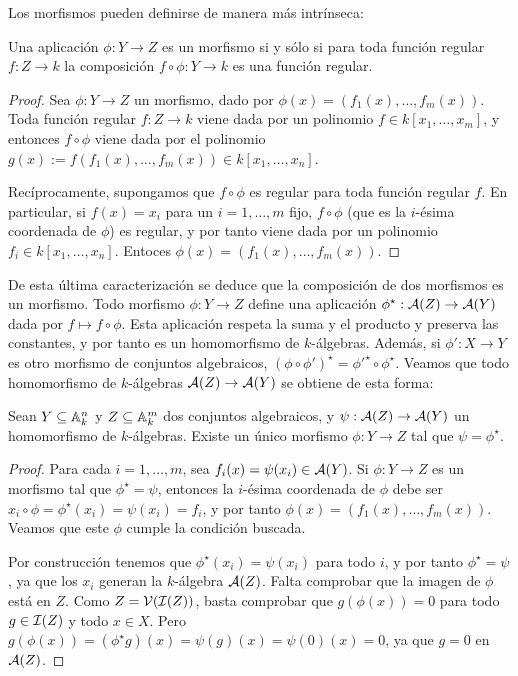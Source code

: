 \documentclass[ACGA.tex]{subfiles}
\begin{document}
Los morfismos pueden definirse de manera más intrínseca:

\begin{prop}
 Una aplicación $\phi:Y\to Z$ es un morfismo si y sólo si para toda función regular $f:Z\to k$ la composición $f\circ\phi:Y\to k$ es una función regular.
\end{prop}

 \begin{proof}
  Sea $\phi:Y\to Z$ un morfismo, dado por $\phi(x)=(f_1(x),\ldots,f_m(x))$. Toda función regular $f:Z\to k$ viene dada por un polinomio $f\in k[x_1,\ldots,x_m]$, y entonces $f\circ\phi$ viene dada por el polinomio $g(x):=f(f_1(x),\ldots,f_m(x))\in k[x_1,\ldots,x_n]$.

Recíprocamente, supongamos que $f\circ\phi$ es regular para toda función regular $f$. En particular, si $f(x)=x_i$ para un $i=1,\ldots,m$ fijo, $f\circ\phi$ (que es la $i$-ésima coordenada de $\phi$) es regular, y por tanto viene dada por un polinomio $f_i\in k[x_1,\ldots,x_n]$. Entoces $\phi(x)=(f_1(x),\ldots,f_m(x))$.
 \end{proof}

De esta última caracterización se deduce que la composición de dos morfismos es un morfismo. Todo morfismo $\phi:Y\to Z$ define una aplicación $\phi^\star:\mathcal{A}(Z)\to\mathcal{A}(Y)$ dada por $f\mapsto f\circ\phi$. Esta aplicación respeta la suma y el producto y preserva las constantes, y por tanto es un homomorfismo de $k$-álgebras. Además, si $\phi':X\to Y$ es otro morfismo de conjuntos algebraicos, $(\phi\circ\phi')^\star=\phi'^\star\circ\phi^\star$. Veamos que todo homomorfismo de $k$-álgebras $\mathcal{A}(Z)\to\mathcal{A}(Y)$ se obtiene de esta forma:

\begin{prop}\label{funtor}
 Sean $Y\subseteq\mathbb{A}^n_k$ y $Z\subseteq\mathbb{A}^m_k$ dos conjuntos algebraicos, y $\psi:\mathcal{A}(Z)\to\mathcal{A}(Y)$ un homomorfismo de $k$-álgebras. Existe un único morfismo $\phi:Y\to Z$ tal que $\psi=\phi^\star$.
\end{prop}

\begin{proof}
 Para cada $i=1,\ldots,m$, sea $f_i(x)=\psi(x_i)\in\mathcal{A}(Y)$. Si $\phi:Y\to Z$ es un morfismo tal que $\phi^\star=\psi$, entonces la $i$-ésima coordenada de $\phi$ debe ser $x_i\circ\phi=\phi^\star(x_i)=\psi(x_i)=f_i$, y por tanto $\phi(x)=(f_1(x),\ldots,f_m(x))$. Veamos que este $\phi$ cumple la condición buscada.

 Por construcción tenemos que $\phi^\star(x_i)=\psi(x_i)$ para todo $i$, y por tanto $\phi^\star=\psi$, ya que los $x_i$ generan la $k$-álgebra $\mathcal{A}(Z)$. Falta comprobar que la imagen de $\phi$ está en $Z$. Como $Z=\mathcal{V}(\mathcal{I}(Z))$, basta comprobar que $g(\phi(x))=0$ para todo $g\in\mathcal{I}(Z)$ y todo $x\in X$. Pero $g(\phi(x))=(\phi^\star g)(x)=\psi(g)(x)=\psi(0)(x)=0$, ya que $g=0$ en $\mathcal{A}(Z)$. 
\end{proof}
\end{document}
